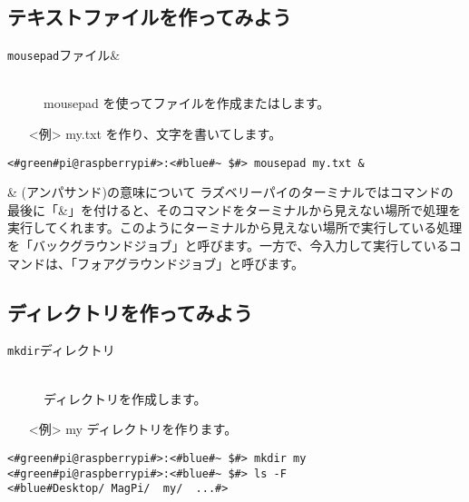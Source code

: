 \subsection{テキストファイルを作ってみよう}
\begin{description}
\item[\texttt{mousepad}\textvisiblespace ファイル\textvisiblespace \&]\mbox{}\\
mousepad を使ってファイルを作成またはします。
\end{description}
\begin{itemize}
\item[<例>]my.txt を作り、文字を書いてします。
\end{itemize}
\begin{lstlisting}[caption=mousepadの例, label=mousepad]
<#green#pi@raspberrypi#>:<#blue#~ $#> mousepad my.txt &
\end{lstlisting}

\begin{itembox}[c]{\& (アンパサンド)の意味について}
    ラズベリーパイのターミナルではコマンドの最後に「\&」を付けると、そのコマンドをターミナルから見えない場所で処理を実行してくれます。このようにターミナルから見えない場所で実行している処理を「バックグラウンドジョブ」と呼びます。一方で、今入力して実行しているコマンドは、「フォアグラウンドジョブ」と呼びます。
\end{itembox}

\subsection{ディレクトリを作ってみよう}
\begin{description}
\item[\texttt{mkdir}\textvisiblespace ディレクトリ]\mbox{}\\
ディレクトリを作成します。
\end{description}
\begin{itemize}
\item[<例>]my ディレクトリを作ります。
\end{itemize}
\begin{lstlisting}[caption=mkdirの例, label=mkdir]
<#green#pi@raspberrypi#>:<#blue#~ $#> mkdir my
<#green#pi@raspberrypi#>:<#blue#~ $#> ls -F
<#blue#Desktop/	MagPi/	my/	 ...#>
\end{lstlisting}

